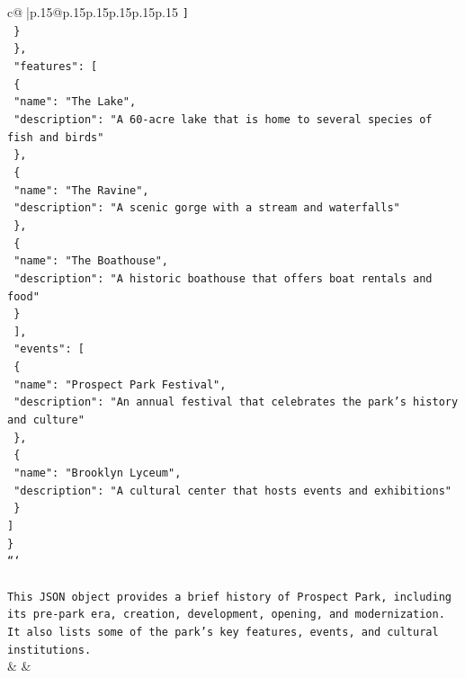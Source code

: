\documentclass{article}
\begin{document}
{\begin{supertabular}{c@{$\;$}|p{.15\linewidth}@{}p{.15\linewidth}p{.15\linewidth}p{.15\linewidth}p{.15\linewidth}p{.15\linewidth}}
{{{\texttt{      {]}} \\
\texttt{    \}} \\
\texttt{  \},} \\
\texttt{  "features": {[}} \\
\texttt{    \{} \\
\texttt{      "name": "The Lake",} \\
\texttt{      "description": "A 60{-}acre lake that is home to several species of fish and birds"} \\
\texttt{    \},} \\
\texttt{    \{} \\
\texttt{      "name": "The Ravine",} \\
\texttt{      "description": "A scenic gorge with a stream and waterfalls"} \\
\texttt{    \},} \\
\texttt{    \{} \\
\texttt{      "name": "The Boathouse",} \\
\texttt{      "description": "A historic boathouse that offers boat rentals and food"} \\
\texttt{    \}} \\
\texttt{  {]},} \\
\texttt{  "events": {[}} \\
\texttt{    \{} \\
\texttt{      "name": "Prospect Park Festival",} \\
\texttt{      "description": "An annual festival that celebrates the park's history and culture"} \\
\texttt{    \},} \\
\texttt{    \{} \\
\texttt{      "name": "Brooklyn Lyceum",} \\
\texttt{      "description": "A cultural center that hosts events and exhibitions"} \\
\texttt{    \}} \\
\texttt{  {]}} \\
\texttt{\}} \\
\texttt{```} \\
\\ 
\texttt{This JSON object provides a brief history of Prospect Park, including its pre{-}park era, creation, development, opening, and modernization. It also lists some of the park's key features, events, and cultural institutions.} \\
            }
        }
    }
    & & \\ \\


\end{supertabular}}
\end{document}
